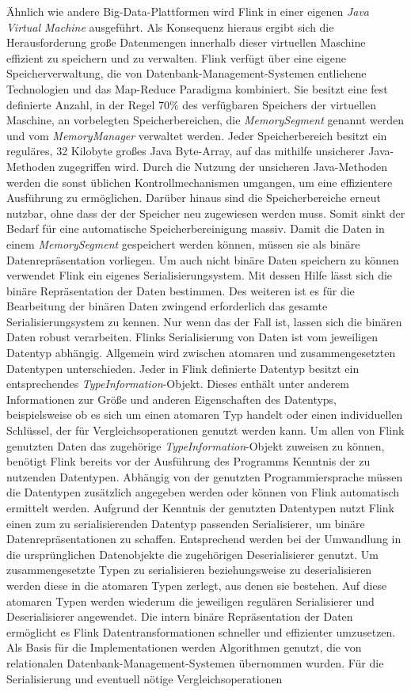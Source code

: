Ähnlich wie andere Big-Data-Plattformen wird Flink in einer eigenen \textit{Java Virtual Machine} ausgeführt. Als Konsequenz hieraus ergibt sich die Herausforderung große Datenmengen innerhalb dieser virtuellen Maschine effizient zu speichern und zu verwalten. Flink verfügt über eine eigene Speicherverwaltung, die von Datenbank-Management-Systemen entliehene Technologien und das Map-Reduce Paradigma kombiniert. Sie besitzt eine fest definierte Anzahl, in der Regel 70\% des verfügbaren Speichers der virtuellen Maschine, an vorbelegten Speicherbereichen, die \textit{MemorySegment} genannt werden und vom \textit{MemoryManager} verwaltet werden. Jeder Speicherbereich besitzt ein reguläres, 32 Kilobyte großes Java Byte-Array, auf das mithilfe unsicherer Java-Methoden zugegriffen wird. Durch die Nutzung der unsicheren Java-Methoden werden die sonst üblichen Kontrollmechanismen umgangen, um eine effizientere Ausführung zu ermöglichen. Darüber hinaus sind die Speicherbereiche erneut nutzbar, ohne dass der der Speicher neu zugewiesen werden muss. Somit sinkt der Bedarf für eine automatische Speicherbereinigung massiv. Damit die Daten in einem \textit{MemorySegment} gespeichert werden können, müssen sie als binäre Datenrepräsentation vorliegen. Um auch nicht binäre Daten speichern zu können verwendet Flink ein eigenes Serialisierungsystem. Mit dessen Hilfe lässt sich die binäre Repräsentation der Daten bestimmen. Des weiteren ist es für die Bearbeitung der binären Daten zwingend erforderlich das gesamte Serialisierungsystem zu kennen. Nur wenn das der Fall ist, lassen sich die binären Daten robust verarbeiten. Flinks Serialisierung von Daten ist vom jeweiligen Datentyp abhängig. Allgemein wird zwischen atomaren und zusammengesetzten Datentypen unterschieden. Jeder in Flink definierte Datentyp besitzt ein entsprechendes \textit{TypeInformation}-Objekt. Dieses enthält unter anderem Informationen zur Größe und anderen Eigenschaften des Datentyps, beispielsweise ob es sich um einen atomaren Typ handelt oder einen individuellen Schlüssel, der für Vergleichsoperationen genutzt werden kann. Um allen von Flink genutzten Daten das zugehörige \textit{TypeInformation}-Objekt zuweisen zu können, benötigt Flink bereits vor der Ausführung des Programms Kenntnis der zu nutzenden Datentypen. Abhängig von der genutzten Programmiersprache müssen die Datentypen zusätzlich angegeben werden oder können von Flink automatisch ermittelt werden. Aufgrund der Kenntnis der genutzten Datentypen nutzt Flink einen zum zu serialisierenden Datentyp passenden Serialisierer, um binäre Datenrepräsentationen zu schaffen. Entsprechend werden bei der Umwandlung in die ursprünglichen Datenobjekte die zugehörigen Deserialisierer genutzt. Um zusammengesetzte Typen zu serialisieren beziehungsweise zu deserialisieren werden diese in die atomaren Typen zerlegt, aus denen sie bestehen. Auf diese atomaren Typen werden wiederum die jeweiligen regulären Serialisierer und Deserialisierer angewendet. Die intern binäre Repräsentation der Daten ermöglicht es Flink Datentransformationen schneller und effizienter umzusetzen. Als Basis für die Implementationen werden Algorithmen genutzt, die von relationalen Datenbank-Management-Systemen \cite{Codd1970} übernommen wurden. Für die Serialisierung und eventuell nötige Vergleichsoperationen 